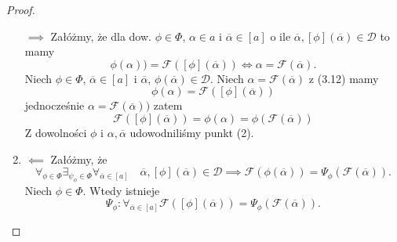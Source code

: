 \documentclass[12pt,a4paper]{report}
\newcommand{\domkniecie}[1]{\left\lbrack{#1}\right\rbrack}
\begin{document}
\begin{proof}
\begin{enumerate}
$\implies$
Załóżmy, że dla dow. $\phi \in \Phi$, $\alpha \in a$ i $\overline{\alpha} \in \domkniecie{a}$ o ile $\overline{\alpha}, \domkniecie{\phi}(\overline{\alpha}) \in \mathcal{D}$ to mamy 
\begin{equation}
\phi(\alpha))=\mathcal{F}(\domkniecie{\phi}(\overline{\alpha})) \iff \alpha=\mathcal{F}(\overline{\alpha}).
\end{equation}
Niech $\phi \in \Phi$, $\overline{\alpha} \in \domkniecie{a}$ i $\overline{\alpha}$, $\phi(\overline{\alpha}) \in \mathcal{D}$. Niech $\alpha=\mathcal{F}(\overline{\alpha})$ z (3.12) mamy 
$$
\phi(\alpha)=\mathcal{F}(\domkniecie{\phi}(\overline{\alpha}))
$$
 jednocześnie $\alpha=\mathcal{F}(\overline{\alpha}))$ zatem
$$
\mathcal{F}(\domkniecie{\phi}(\overline{\alpha}))=\phi(\alpha)=\phi(\mathcal{F}(\overline{\alpha}))
$$
Z dowolności $\phi$ i $\alpha, \overline{\alpha}$ udowodniliśmy punkt (2).
\item
$\impliedby$
Załóżmy, że
\begin{equation*}
\forall_{\phi \in \Phi}  \exists_{\psi_{\phi}\in \Phi} \forall_{\overline{\alpha} \in \domkniecie{a}} \quad \overline{\alpha}, \domkniecie{\phi}(\overline{\alpha}) \in \mathcal{D} \implies \mathcal{F}(\phi(\overline{\alpha}))=\Psi_{\phi}(\mathcal{F}(\overline{\alpha})).
\end{equation*}
Niech $\phi \in \Phi$. Wtedy istnieje 
\begin{equation}
\Psi_{\phi}: \forall_{\overline{\alpha} \in \domkniecie{a}} \mathcal{F}(\domkniecie{\phi}(\overline{\alpha}))=\Psi_{\phi}(\mathcal{F}(\overline{\alpha})).
\end{equation}


\end{enumerate}
\end{proof}
\end{document}
